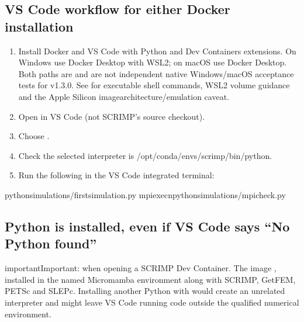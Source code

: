 \documentclass[letterpaper,10pt,english]{sphinxmanual}
\begin{document}
\subsection{VS Code workflow for either Docker installation}
\label{\detokenize{vscode:vs-code-workflow-for-either-docker-installation}}\begin{enumerate}
%
\item {} 
\sphinxAtStartPar
Install Docker and VS Code with Python and Dev Containers extensions.
On Windows use Docker Desktop with WSL2; on macOS use Docker Desktop.
Both paths are  and are not
independent native Windows/macOS acceptance tests for v1.3.0.
See {\hyperref[\detokenize{install::doc}]{}} for executable shell commands, WSL2 volume
guidance and the Apple Silicon image\sphinxhyphen{}architecture/emulation caveat.

\item {} 
\sphinxAtStartPar
Open  in VS Code (not SCRIMP’s source checkout).

\item {} 
\sphinxAtStartPar
Choose .

\item {} 
\sphinxAtStartPar
Check the selected interpreter is
/opt/conda/envs/scrimp/bin/python.

\item {} 
\sphinxAtStartPar
Run the following in the VS Code integrated terminal:

\end{enumerate}

\begin{sphinxVerbatim}[commandchars=\\\{\}]
pythonsimulations/first\PYGZus{}simulation.py
mpiexec\PYGZhy{}npythonsimulations/mpi\PYGZus{}check.py
\end{sphinxVerbatim}


\subsection{Python is installed, even if VS Code says “No Python found”}
\label{\detokenize{vscode:python-is-installed-even-if-vs-code-says-no-python-found}}
\begin{sphinxadmonition}{important}{Important:}
\sphinxAtStartPar
{} when opening a SCRIMP
Dev Container. The image , installed
in the named Micromamba environment  along with
SCRIMP, GetFEM, PETSc and SLEPc. Installing another Python with
 would create an unrelated interpreter and might leave
VS Code running code outside the qualified numerical environment.
\end{sphinxadmonition}
\end{document}

